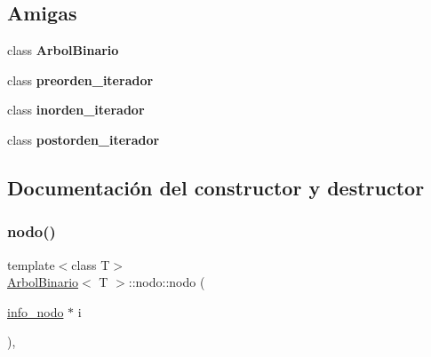 \subsection*{Amigas}
\begin{DoxyCompactItemize}
\item 
\mbox{\label{classArbolBinario_1_1nodo_a7aaf1bc41122321eaeb4dcc50d489fe8}} 
class {\bfseries Arbol\+Binario}
\item 
\mbox{\label{classArbolBinario_1_1nodo_a4aa0da8bfbc320a8daff98451ee65b6c}} 
class {\bfseries preorden\+\_\+iterador}
\item 
\mbox{\label{classArbolBinario_1_1nodo_ac74c0fa737805eb9e7cca733f43f4e62}} 
class {\bfseries inorden\+\_\+iterador}
\item 
\mbox{\label{classArbolBinario_1_1nodo_a4c0a969b995bdaf811e374833b2bafd4}} 
class {\bfseries postorden\+\_\+iterador}
\end{DoxyCompactItemize}


\subsection{Documentación del constructor y destructor}
\mbox{\label{classArbolBinario_1_1nodo_a9c0015bf78e40fc811ad106804cba939}} 
\subsubsection{\texorpdfstring{nodo()}{nodo()}\hspace{0.1cm}{\footnotesize\ttfamily [1/2]}}
{\footnotesize\ttfamily template$<$class T$>$ \\
\hyperlink{classArbolBinario}{Arbol\+Binario}$<$ T $>$\+::nodo\+::nodo (\begin{DoxyParamCaption}\item[{\hyperlink{structArbolBinario_1_1info__nodo}{info\+\_\+nodo} $\ast$}]{i }\end{DoxyParamCaption})\hspace{0.3cm}{\ttfamily [inline]}, {\ttfamily [private]}}



